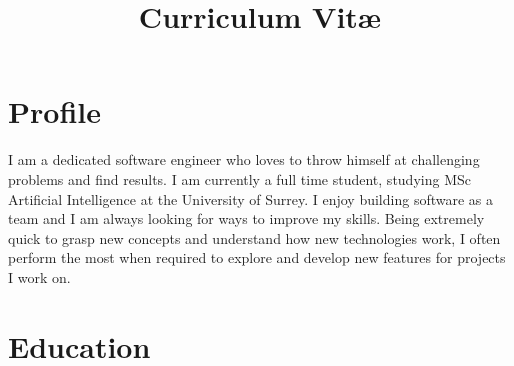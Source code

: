 \documentclass[11pt,a4paper,sans]{moderncv}
\title{Curriculum Vitæ}
\begin{document}


% 

\makecvtitle

\section{Profile}

I am a dedicated software engineer who loves to throw himself at challenging problems and find results. I am currently
a full time student, studying MSc Artificial Intelligence at the University of Surrey. I enjoy
building software as a team and I am always looking for ways to improve my skills. Being extremely quick to grasp new
concepts and understand how new technologies work, I often perform the most when required to explore and develop
new features for projects I work on.


\section{Education}
\end{document}
